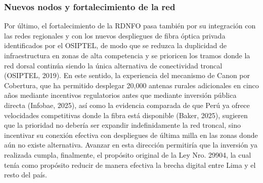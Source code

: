 \subsubsection{Nuevos nodos y fortalecimiento de la red}
Por último, el fortalecimiento de la RDNFO pasa también por su integración con las redes regionales y con los nuevos despliegues de fibra óptica privada identificados por el OSIPTEL, de modo que se reduzca la duplicidad de infraestructura en zonas de alta competencia y se prioricen los tramos donde la red dorsal continúa siendo la única alternativa de conectividad troncal (OSIPTEL, 2019). En este sentido, la experiencia del mecanismo de Canon por Cobertura, que ha permitido desplegar 20,000 antenas rurales adicionales en cinco años mediante incentivos regulatorios antes que mediante inversión pública directa (Infobae, 2025), así como la evidencia comparada de que Perú ya ofrece velocidades competitivas donde la fibra está disponible (Baker, 2025), sugieren que la prioridad no debería ser expandir indefinidamente la red troncal, sino incentivar su conexión efectiva con despliegues de última milla en las zonas donde aún no existe alternativa. Avanzar en esta dirección permitiría que la inversión ya realizada cumpla, finalmente, el propósito original de la Ley Nro. 29904, la cual tenía como propósito reducir de manera efectiva la brecha digital entre Lima y el resto del país.
